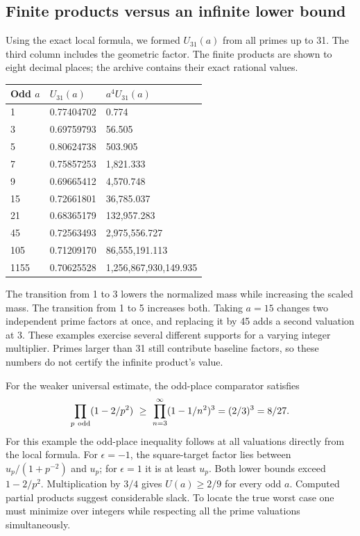 \documentclass[12pt,letterpaper]{article}
\begin{document}
\clearpage\subsection{Finite products versus an infinite lower bound}
Using the exact local formula, we formed \(U_{31}(a)\) from all primes up to 31. The third column includes the geometric factor. The finite products are shown to eight decimal places; the archive contains their exact rational values.
\begin{center}\small\begin{tabular}{lll}\toprule Odd $a$ & $U_{31}(a)$ & $a^4U_{31}(a)$\\\midrule 
1 & 0.77404702 & 0.774\\
3 & 0.69759793 & 56.505\\
5 & 0.80624738 & 503.905\\
7 & 0.75857253 & 1,821.333\\
9 & 0.69665412 & 4,570.748\\
15 & 0.72661801 & 36,785.037\\
21 & 0.68365179 & 132,957.283\\
45 & 0.72563493 & 2,975,556.727\\
105 & 0.71209170 & 86,555,191.113\\
1155 & 0.70625528 & 1,256,867,930,149.935\\\bottomrule\end{tabular}\end{center}
The transition from 1 to 3 lowers the normalized mass while increasing the scaled mass. The transition from 1 to 5 increases both. Taking \(a=15\) changes two independent prime factors at once, and replacing it by 45 adds a second valuation at 3. These examples exercise several different supports for a varying integer multiplier. Primes larger than 31 still contribute baseline factors, so these numbers do not certify the infinite product's value.

For the weaker universal estimate, the odd-place comparator satisfies
\[
 \prod_{p\ {\rm odd}}(1-2/p^2)\ \ge\
 \prod_{n=3}^\infty (1-1/n^2)^3=(2/3)^3=8/27.
\]
For this example the odd-place inequality follows at all valuations directly from the local formula. For \(\epsilon=-1\), the square-target factor lies between \(u_p/(1+p^{-2})\) and \(u_p\); for \(\epsilon=1\) it is at least \(u_p\). Both lower bounds exceed \(1-2/p^2\). Multiplication by \(3/4\) gives \(U(a)\ge2/9\) for every odd \(a\). Computed partial products suggest considerable slack. To locate the true worst case one must minimize over integers while respecting all the prime valuations simultaneously.
\end{document}
